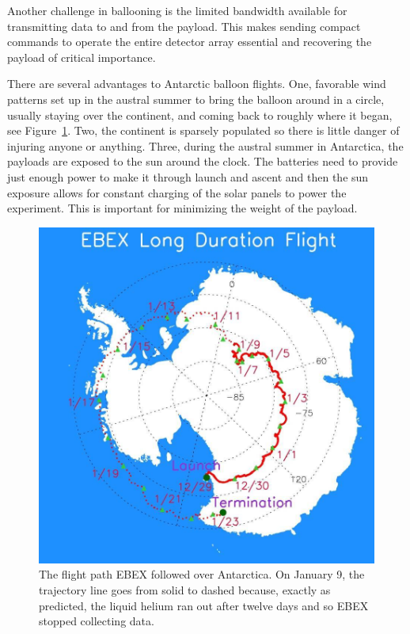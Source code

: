 Another challenge in ballooning is the limited bandwidth available for transmitting data to and from the payload. 
This makes sending compact commands to operate the entire detector array essential and  recovering the payload of critical importance. 

There are several advantages to Antarctic balloon flights. 
One, favorable wind patterns set up in the austral summer to bring the balloon around in a circle, usually staying over the continent, and coming back to roughly where it began, see Figure~\ref{fig:flight_trajectory}. 
Two, the continent is sparsely populated so there is little danger of injuring anyone or anything. 
Three, during the austral summer in Antarctica, the payloads are exposed to the sun around the clock. 
The batteries need to provide just enough power to make it through launch and ascent and then the sun exposure allows for constant charging of the solar panels to power the experiment. 
This is important for minimizing the weight of the payload. 

\begin{figure}[htbp]
\begin{center}
\includegraphics[width=0.6\columnwidth]{figures/ebex_trajectory.jpg}
\caption[EBEX flight trajectory]{The flight path \ac{EBEX} followed over Antarctica. On January 9, the trajectory line goes from solid to dashed because, exactly as predicted, the liquid helium ran out after twelve days and so \ac{EBEX} stopped collecting data. 
\label{fig:flight_trajectory} }
\end{center}
\end{figure}




